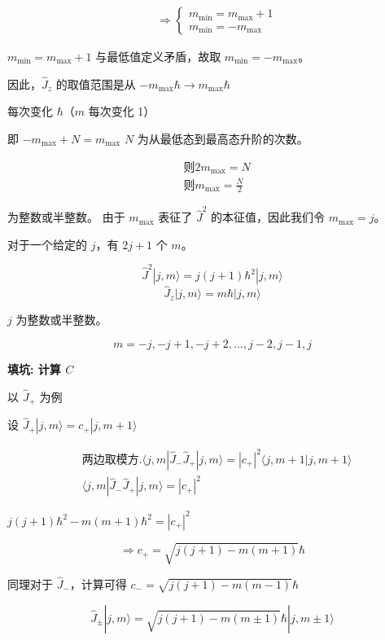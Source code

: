 \documentclass[lang=cn,10pt]{elegantbook}
\begin{document}
\begin{align*}
	&\Longrightarrow \left\{
	\begin{array}{l}
		m_{\text{min}} = m_{\text{max}} + 1 \\
		m_{\text{min}} = -m_{\text{max}}
	\end{array}
	\right.
\end{align*}

\(m_{\text{min}}=m_{\text{max}}+1\) 与最低值定义矛盾，故取 \(m_{\text{min}}=-m_{\text{max}}\)。

因此，\(\hat{J}_z\) 的取值范围是从 \(-m_{\text{max}} \hbar \longrightarrow m_{\text{max}} \hbar\)

每次变化 \(\hbar\)（\(m\) 每次变化 1）

即 \(-m_{\text{max}} + N = m_{\text{max}}\) \(N\) 为从最低态到最高态升阶的次数。

\begin{align*}
	&\text{则} 2 m_{\text{max}} = N \\
	&\text{则} m_{\text{max}} = \frac{N}{2}
\end{align*}

为整数或半整数。
由于 \( m_{\text{max}} \) 表征了 \( \hat{J}^2 \) 的本征值，因此我们令 \( m_{\text{max}} = j \)。

对于一个给定的 \( j \)，有 \( 2j + 1 \) 个 \( m \)。

\[
\hat{J}^2 |j, m\rangle = j(j+1) \hbar^2 |j, m\rangle
\]
\[
\hat{J}_z |j, m\rangle = m \hbar |j, m\rangle
\]

\( j \) 为整数或半整数。

\[
m = -j, -j+1, -j+2, \ldots, j-2, j-1, j
\]

\textbf{填坑: 计算 \(C\)}

以 \(\hat{J}_+\) 为例

设 \(\hat{J}_+ |j, m\rangle = c_+ |j, m+1\rangle\)

\begin{align*}
	&\text{两边取模方.} \langle j, m | \hat{J}_- \hat{J}_+ | j, m \rangle = |c_+|^2 \langle j, m+1 | j, m+1 \rangle \\
	&\langle j, m | \hat{J}_- \hat{J}_+ | j, m \rangle = |c_+|^2
\end{align*}

\(j(j+1)\hbar^2 - m(m+1)\hbar^2 = |c_+|^2\)

\[
\Longrightarrow c_+ = \sqrt{j(j+1) - m(m+1)} \hbar
\]

同理对于 \(\hat{J}_-\)，计算可得 \(c_- = \sqrt{j(j+1) - m(m-1)} \hbar\)

\[
\hat{J}_{\pm} |j, m\rangle = \sqrt{j(j+1) - m(m\pm1)} \hbar |j, m\pm1\rangle
\]
\end{document}
